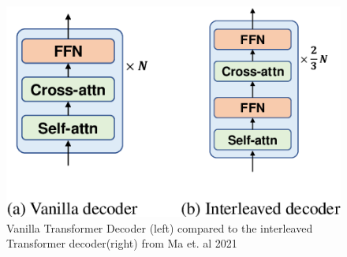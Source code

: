 \begin{figure}
    \centering%
    \includegraphics[width=0.5\linewidth]{Latex/sections/images/interleaveddecoder.png}
    \caption{Vanilla Transformer Decoder (left) compared to the interleaved Transformer decoder(right) from Ma et. al 2021}
    \label{fig:interleaved decoder}
\end{figure}